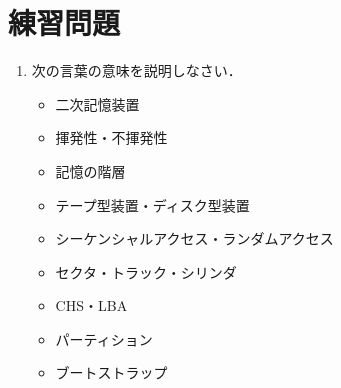 \section*{練習問題}
\begin{enumerate}
\item 次の言葉の意味を説明しなさい．
  \begin{itemize}
  \item 二次記憶装置
  \item 揮発性・不揮発性
  \item 記憶の階層
  \item テープ型装置・ディスク型装置
  \item シーケンシャルアクセス・ランダムアクセス
  \item セクタ・トラック・シリンダ
  \item CHS・LBA
  \item パーティション
  \item ブートストラップ
  \end{itemize}
\end{enumerate}
